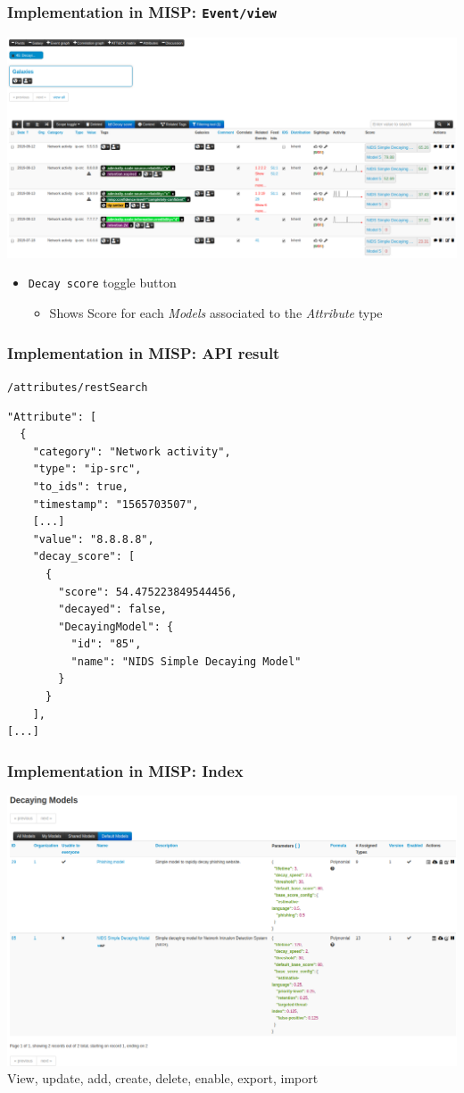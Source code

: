 \begin{frame}
    \frametitle{Implementation in MISP: \texttt{Event/view}}
    \includegraphics[width=1.00\linewidth]{decaying-event.png}
    \begin{itemize}
        \item \texttt{Decay score} toggle button
        \begin{itemize}
            \item Shows Score for each \textit{Models} associated to the \textit{Attribute} type
        \end{itemize}
    \end{itemize}
\end{frame}

\begin{frame}[fragile]
    \frametitle{Implementation in MISP: API result}
    \texttt{/attributes/restSearch}
    \begin{lstlisting}
"Attribute": [
  {
    "category": "Network activity",
    "type": "ip-src",
    "to_ids": true,
    "timestamp": "1565703507",
    [...]
    "value": "8.8.8.8",
    "decay_score": [
      {
        "score": 54.475223849544456,
        "decayed": false,
        "DecayingModel": {
          "id": "85",
          "name": "NIDS Simple Decaying Model"
        }
      }
    ],
[...]
    \end{lstlisting}
\end{frame}


\begin{frame}
    \frametitle{Implementation in MISP: Index}
    \includegraphics[width=1.00\linewidth]{decaying-index.png}
    View, update, add, create, delete, enable, export, import
\end{frame}

